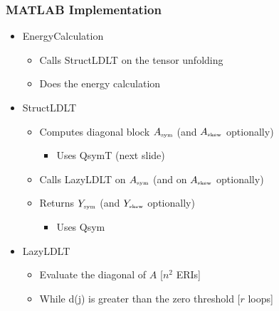 \documentclass[bigger]{beamer}
\begin{document}
\begin{frame}
\frametitle{MATLAB Implementation}
\label{sec-1-27}
\begin{itemize}

\item EnergyCalculation
\label{sec-1-27-1}%
\begin{itemize}

\item Calls StructLDLT on the tensor unfolding
\label{sec-1-27-1-1}%

\item Does the energy calculation
\label{sec-1-27-1-2}%
\end{itemize} %

\item StructLDLT
\label{sec-1-27-2}%
\begin{itemize}

\item Computes diagonal block $A_{\mbox{\tiny sym}}$ (and $A_{\mbox{\tiny skew}}$ optionally)
\label{sec-1-27-2-1}%
\begin{itemize}

\item Uses QsymT (next slide)
\label{sec-1-27-2-1-1}%
\end{itemize} %

\item Calls LazyLDLT on $A_{\mbox{\tiny sym}}$ (and on $A_{\mbox{\tiny skew}}$ optionally)
\label{sec-1-27-2-2}%

\item Returns $Y_{\mbox{\tiny sym}}$ (and $Y_{\mbox{\tiny skew}}$ optionally)
\label{sec-1-27-2-3}%
\begin{itemize}

\item Uses Qsym
\label{sec-1-27-2-3-1}%
\end{itemize} %
\end{itemize} %

\item LazyLDLT
\label{sec-1-27-3}%
\begin{itemize}

\item Evaluate the diagonal of $A$ [$n^2$ ERIs]
\label{sec-1-27-3-1}%

\item While d(j) is greater than the zero threshold [$r$ loops]
\label{sec-1-27-3-2}%
\begin{itemize}


\end{itemize}
\end{itemize}
\end{itemize}
\end{frame}
\end{document}

